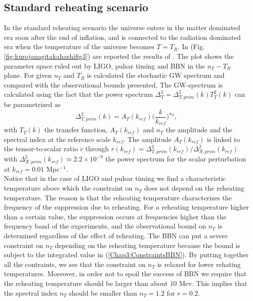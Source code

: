 \documentclass[11pt,a4paper,twoside]{book}
\begin{document}
\subsection*{Standard reheating scenario}
In the standard reheating scenario the universe enters in the matter dominated era soon after the end of inflation, and is connected to the radiation dominated era when the temperature of the universe becomes $ T=T_{R} $. In (Fig. \ref{fig:kurojanagitakahashifig3}) are reported the results of \cite{Chap3:BlueTiltedSpectrum}. The plot shows the parameter space ruled out by LIGO, pulsar timing and BBN in the $ n_{T}-T_{R} $ plane. For given $ n_{T} $ and $ T_{R} $ is calculated the stochastic GW spectrum and compared with the observational bounds presented. The GW-spectrum is calculated using the fact that the power spectrum $\Delta_{T}^{2}=\Delta_{T,prim}^{2}(k)T_{T}^{2}(k)$ can be parametrized as
\begin{equation}
\Delta_{T,prim}^{2}(k)=A_{T}(k_{ref})\Big(\frac{k}{k_{ref}}\Big)^{n_{T}},
\end{equation} 
with $ T_{T}(k) $ the transfer function, $ A_{T}(k_{ref}) $ and $ n_{T} $ the amplitude and the spectral index at the reference scale $ k_{ref} $. The amplitude  $ A_{T}(k_{ref}) $  is linked to the tensor-to-scalar ratio $ r $ through $ r(k_{ref})=\Delta_{T,prim}^{2}(k_{ref})/\Delta_{\mathcal{R},prim}^{2}(k_{ref}) $ with $ \Delta_{\mathcal{R},prim}^{2}(k_{ref}) \simeq 2.2 \times 10^{-9} $ the power spectrum for the scalar perturbation at $ k_{ref}=0.01 $ Mpc$ ^{-1} $.\\
Notice that in the case of LIGO and pulsar timing we find a characteristic temperature above which the constraint on $ n_{T} $ does not depend on the reheating temperature. The reason is that the reheating temperature characterizes the frequency of the suppression due to reheating. For a reheating temperature higher than a certain value, the suppression occurs at  frequencies higher than the frequency band of the experiments, and the observational bound on $ n_{T} $ is determined regardless of the effect of reheating. The BBN can put a severe constraint on $ n_{T} $ depending on the reheating temperature because the bound is subject to the integrated value in (\ref{Chap3:ConstraintsBBN}). By putting together all the contraints, we see that the constraint on $ n_{T} $ is relaxed for lower rehating temperatures. Moreover, in order not to spoil the success of BBN we require that the reheating temperature should be larger than about $ 10 $ Mev. This implies that the spectral index $ n_{T} $ should be smaller than $ n_{T}=1.2 $ for $ r=0.2 $.
\end{document}
